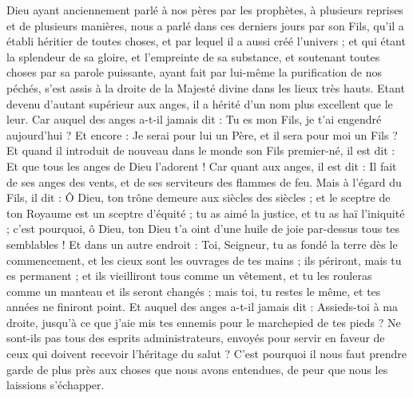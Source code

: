 \begin{multicols}{2}
\VerseOne{}Dieu ayant anciennement parlé à nos pères par les prophètes, à plusieurs reprises et de plusieurs manières,
nous a parlé dans ces derniers jours par son Fils, qu'il a établi héritier de toutes choses, et par lequel il a aussi créé l'univers ;
et qui étant la splendeur de sa gloire, et l'empreinte de sa substance, et soutenant toutes choses par sa parole puissante, ayant fait par lui-même la purification de nos péchés, s'est assis à la droite de la Majesté divine dans les lieux très hauts.
Etant devenu d'autant supérieur aux anges, il a hérité d'un nom plus excellent que le leur.
Car auquel des anges a-t-il jamais dit : Tu es mon Fils, je t'ai engendré aujourd'hui ? Et encore : Je serai pour lui un Père, et il sera pour moi un Fils ?
Et quand il introduit de nouveau dans le monde son Fils premier-né, il est dit : Et que tous les anges de Dieu l'adorent !
Car quant aux anges, il est dit : Il fait de ses anges des vents, et de ses serviteurs des flammes de feu.
Mais à l'égard du Fils, il dit : Ô Dieu, ton trône demeure aux siècles des siècles ; et le sceptre de ton Royaume est un sceptre d'équité ;
tu as aimé la justice, et tu as haï l'iniquité ; c'est pourquoi, ô Dieu, ton Dieu t'a oint d'une huile de joie par-dessus tous tes semblables !
Et dans un autre endroit : Toi, Seigneur, tu as fondé la terre dès le commencement, et les cieux sont les ouvrages de tes mains ;
ils périront, mais tu es permanent ; et ils vieilliront tous comme un vêtement,
et tu les rouleras comme un manteau et ils seront changés ; mais toi, tu restes le même, et tes années ne finiront point.
Et auquel des anges a-t-il jamais dit : Assieds-toi à ma droite, jusqu'à ce que j'aie mis tes ennemis pour le marchepied de tes pieds ?
Ne sont-ils pas tous des esprits administrateurs, envoyés pour servir en faveur de ceux qui doivent recevoir l'héritage du salut ?
\VerseOne{}C'est pourquoi il nous faut prendre garde de plus près aux choses que nous avons entendues, de peur que nous les laissions s'échapper.

\end{multicols}

